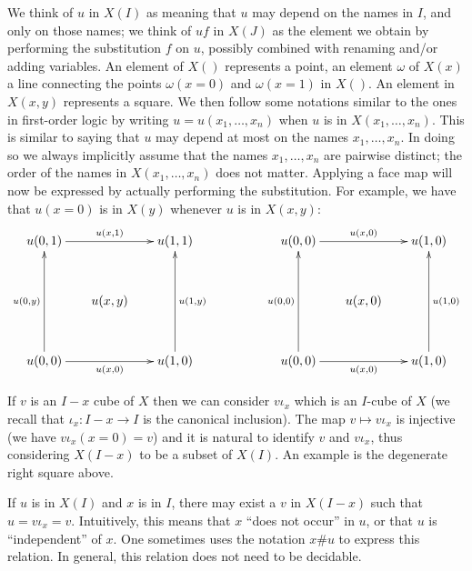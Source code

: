 \documentclass[a4paper,USenglish,draft]{lipics}
\begin{document}
We think of $u$ in $X(I)$ as meaning that $u$ may depend on the names
in $I$, and only on those names; we think of $uf$ in $X(J)$ as the
element we obtain by performing the substitution $f$ on $u$, possibly
combined with renaming and/or adding variables.  An element of $X()$
represents a point, an element $\omega$ of $X(x)$ a line connecting
the points $\omega(x=0)$ and $\omega(x=1)$ in $X()$. An element in
$X(x,y)$ represents a square.  We then follow some notations similar
to the ones in first-order logic by writing $u = u(x_1,\dots,x_n)$
when $u$ is in $X(x_1,\dots,x_n)$. This is similar to saying that $u$
may depend at most on the names $x_1,\dots,x_n$.  In doing so we
always implicitly assume that the names $x_1,\dots,x_n$ are pairwise
distinct; the order of the names in $X(x_1,\dots,x_n)$ does not
matter. Applying a face map will now be expressed by actually
performing the substitution. For example, we have that $u(x=0)$ is in
$X(y)$ whenever $u$ is in $X(x,y)$:
\[
\xymatrix@R=1.1cm@C=.6cm{
u(0,1)\ar[rr]^{u(x,1)}                &      & u(1,1)                   &&&
u(0,0)\ar[rr]^{u(x,0)}                &      & u(1,0)                       \\
                                      &u(x,y)&                          &&&
                                      &u(x,0)&                              \\
u(0,0)\ar[rr]_{u(x,0)}\ar[uu]^{u(0,y)}&      & u(1,0)\ar[uu]_{u(1,y)}   &&&
u(0,0)\ar[rr]_{u(x,0)}\ar[uu]^{u(0,0)}&      & u(1,0)\ar[uu]_{u(1,0)}       \\
}
\]

If $v$ is an $I-x$ cube of $X$ then we can consider $v\iota_x$ which
is an $I$-cube of $X$ (we recall that $\iota_x:I-x\to I$ is the
canonical inclusion). The map $v\longmapsto v\iota_x$ is injective (we
have $v\iota_x(x=0) = v$) and it is natural to identify $v$ and
$v\iota_x$, thus considering $X(I-x)$ to be a subset of $X(I)$. An
example is the degenerate right square above.

If $u$ is in $X(I)$ and $x$ is in $I$, there may exist a $v$ in
$X(I-x)$ such that $u = v\iota_x = v$.  Intuitively, this means that
$x$ ``does not occur'' in $u$, or that $u$ is ``independent'' of
$x$. One sometimes uses the notation $x\#u$ to express this
relation. In general, this relation does not need to be decidable.
\end{document}
